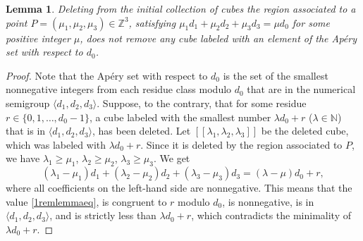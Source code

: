 \documentclass[12pt]{article}
\newtheorem{lemma}[thm]{Lemma}
\theoremstyle{remark}
\begin{document}
\begin{lemma}\label{1remlemma}
    Deleting from the initial collection of cubes the region associated to a point $P = (\mu_1,\mu_2,\mu_3) \in \mathbb{Z}^3$, satisfying $\mu_1d_1 + \mu_2d_2 + \mu_3d_3 = \mu d_0$ for some positive integer $\mu$, does not remove any cube labeled with an element of the Ap{\'e}ry set with respect to $d_0$. 
\end{lemma}
\begin{proof}
    Note that the Ap{\'e}ry set with respect to $d_0$ is the set of the smallest nonnegative integers from each residue class modulo $d_0$ that are in the numerical semigroup $\langle d_1,d_2,d_3\rangle$. Suppose, to the contrary, that for some residue $r \in \{0,1,\dots,d_0-1\}$, a cube labeled with the smallest number $\lambda d_0 + r$ ($\lambda \in \mathbb{N}$) that is in $\langle d_1,d_2,d_3\rangle$, has been deleted. Let $[[\lambda_1,\lambda_2,\lambda_3]]$ be the deleted cube, which was labeled with $\lambda d_0 + r$. Since it is deleted by the region associated to $P$, we have $\lambda_1 \geq \mu_1$, $\lambda_2 \geq \mu_2$, $\lambda_3 \geq \mu_3$. We get
    \begin{equation}\label{1remlemmaeq}
     (\lambda_1 -\mu_1) d_1 + (\lambda_2-\mu_2) d_2 + (\lambda_3-\mu_3) d_3 = (\lambda-\mu) d_0 + r, 
    \end{equation}
    where all coefficients on the left-hand side are nonnegative. This means that the value \eqref{1remlemmaeq}, is congruent to $r$ modulo $d_0$, is nonnegative, is in $\langle d_1,d_2,d_3\rangle$, and is strictly less than $\lambda d_0 + r$, which contradicts the minimality of $\lambda d_0 + r$.
\end{proof}
\end{document}
